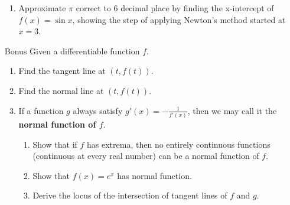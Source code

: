 \documentclass[12pt]{article}
\begin{document}
\begin{enumerate}
\begin{enumerate}
        \item Approximate $\pi$ correct to 6 decimal place by finding the x-intercept of $f(x)=\sin{x}$, showing the step of applying Newton's method started at $x=3$.
    \end{enumerate} 
    \item [Bonus] Given a differentiable function $f$.\begin{enumerate}
        \item Find the tangent line at $(t,f(t))$.
        \item Find the normal line at $(t,f(t))$.
        \item If a function $g$ always satisfy $g'(x)=-\frac{1}{f'(x)}$, then we may call it the \textbf{normal function of $f$}.\begin{enumerate}
            \item Show that if $f$ has extrema, then no entirely continuous functions (continuous at every real number) can be a normal function of $f$.
            \item Show that $f(x)=e^x$ has normal function.
            \item Derive the locus of the intersection of tangent lines of $f$ and $g$.
        \end{enumerate}
    \end{enumerate}
\end{enumerate}
\end{document}
